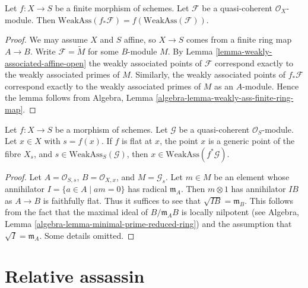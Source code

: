 \begin{lemma}
\label{lemma-weakly-associated-finite}
Let $f : X \to S$ be a finite morphism of schemes.
Let $\mathcal{F}$ be a quasi-coherent $\mathcal{O}_X$-module.
Then $\text{WeakAss}(f_*\mathcal{F}) = f(\text{WeakAss}(\mathcal{F}))$.
\end{lemma}

\begin{proof}
We may assume $X$ and $S$ affine, so $X \to S$ comes from a finite ring map
$A \to B$. Write $\mathcal{F} = \widetilde M$ for some $B$-module $M$. By
Lemma \ref{lemma-weakly-associated-affine-open}
the weakly associated points of $\mathcal{F}$ correspond exactly to the
weakly associated primes of $M$. Similarly, the weakly associated points
of $f_*\mathcal{F}$ correspond exactly to the weakly associated primes
of $M$ as an $A$-module. Hence the lemma follows from
Algebra, Lemma \ref{algebra-lemma-weakly-ass-finite-ring-map}.
\end{proof}

\begin{lemma}
\label{lemma-weakly-ass-pullback}
Let $f : X \to S$ be a morphism of schemes. Let $\mathcal{G}$ be a
quasi-coherent $\mathcal{O}_S$-module. Let $x \in X$ with $s = f(x)$.
If $f$ is flat at $x$, the point $x$ is a generic point of the fibre $X_s$, and
$s \in \text{WeakAss}_S(\mathcal{G})$, then
$x \in \text{WeakAss}(f^*\mathcal{G})$.
\end{lemma}

\begin{proof}
Let $A = \mathcal{O}_{S, s}$, $B = \mathcal{O}_{X, x}$, and
$M = \mathcal{G}_s$. Let $m \in M$ be an element whose annihilator
$I = \{a \in A \mid am = 0\}$ has radical $\mathfrak m_A$. Then
$m \otimes 1$ has annihilator $I B$ as $A \to B$ is
faithfully flat. Thus it suffices to see that $\sqrt{I B} = \mathfrak m_B$.
This follows from the fact that the maximal ideal of $B/\mathfrak m_AB$
is locally nilpotent (see
Algebra, Lemma \ref{algebra-lemma-minimal-prime-reduced-ring})
and the assumption that $\sqrt{I} = \mathfrak m_A$.
Some details omitted.
\end{proof}








\section{Relative assassin}
\label{section-relative-assassin}

